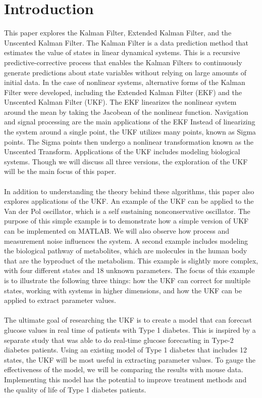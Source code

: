 \chapter{Introduction}
\label{Introduction}

This paper explores the Kalman Filter, Extended Kalman Filter, and the Unscented Kalman Filter. The Kalman Filter is a data prediction method that estimates the value of states in linear dynamical systems. This is a recursive predictive-corrective process that enables the Kalman Filters to continuously generate predictions about state variables without relying on large amounts of initial data.  In the case of nonlinear systems, alternative forms of the Kalman Filter were developed, including the Extended Kalman Filter (EKF) and the Unscented Kalman Filter (UKF). The EKF linearizes the nonlinear system around the mean by taking the Jacobean of the nonlinear function. Navigation and signal processing are the main applications of the EKF Instead of linearizing the system around a single point, the UKF utilizes many points, known as Sigma points. The Sigma points then undergo a nonlinear transformation known as the Unscented Transform. Applications of the UKF includes modeling biological systems. Though we will discuss all three versions, the exploration of the UKF will be the main focus of this paper.  \\ \\
In addition to understanding the theory behind these algorithms, this paper also explores applications of the UKF. An example of the UKF can be applied to the Van der Pol oscillator, which is a self sustaining nonconservative oscillator. The purpose of this simple example is to demonstrate how a simple version of UKF can be implemented on MATLAB. We will also observe how process and measurement noise influences the system. A second example includes modeling the biological pathway of metabolites, which are molecules in the human body that are the byproduct of the metabolism. This example is slightly more complex, with four different states and 18 unknown parameters. The focus of this example is to illustrate the following three things: how the UKF can correct for multiple states, working with systems in higher dimensions, and how the UKF can be applied to extract parameter values. \\ \\
The ultimate goal of researching the UKF is to create a model that can forecast glucose values in real time of patients with Type 1 diabetes. This is inspired by a separate study that was able to do real-time glucose forecasting in Type-2 diabetes patients. Using an existing model of Type 1 diabetes that includes 12 states, the UKF will be most useful in extracting parameter values. To gauge the effectiveness of the model, we will be comparing the results with mouse data. Implementing this model has the potential to improve treatment methods and the quality of life of Type 1 diabetes patients.




